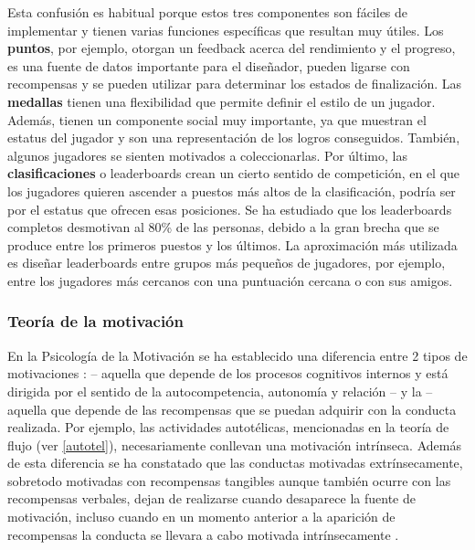 Esta confusión es habitual porque estos tres componentes son fáciles de implementar y tienen varias funciones específicas que resultan muy útiles.
%
Los \textbf{puntos}, por ejemplo, otorgan un feedback acerca del rendimiento y el progreso, es una fuente de datos importante para el diseñador, pueden ligarse con recompensas y se pueden utilizar para determinar los estados de finalización.
%
Las \textbf{medallas} tienen una flexibilidad que permite definir el estilo de un jugador. 
%
Además, tienen un componente social muy importante, ya que muestran el estatus del jugador y son una representación de los logros conseguidos. 
%
También, algunos jugadores se sienten motivados a coleccionarlas.
%
Por último, las \textbf{clasificaciones} o leaderboards crean un cierto sentido de competición, en el que los jugadores quieren ascender a puestos más altos de la clasificación, podría ser por el estatus que ofrecen esas posiciones.
%
Se ha estudiado que los leaderboards completos desmotivan al 80\% de las personas, debido a la gran brecha que se produce entre los primeros puestos y los últimos.
%
La aproximación más utilizada es diseñar leaderboards entre grupos más pequeños de jugadores, por ejemplo, entre los jugadores más cercanos con una puntuación cercana o con sus amigos.


\subsubsection{Teoría de la motivación}
\label{SDT}
\label{PosiblesPeligros}
En la Psicología de la Motivación se ha establecido una diferencia entre 2 tipos de motivaciones  \cite{SDT}:   -- aquella que depende de los procesos cognitivos internos y está dirigida por el sentido de la autocompetencia, autonomía y relación -- y la  -- aquella que depende de las recompensas que se puedan adquirir con la conducta realizada.
%
Por ejemplo, las actividades autotélicas, mencionadas en la teoría de flujo (ver \ref{autotel}), necesariamente conllevan una motivación intrínseca.
%
Además de esta diferencia se ha constatado que las conductas motivadas extrínsecamente, sobretodo motivadas con recompensas tangibles aunque también ocurre con las recompensas verbales, dejan de realizarse cuando desaparece la fuente de motivación, incluso cuando en un momento anterior a la aparición de recompensas la conducta se llevara a cabo motivada intrínsecamente
%
 \cite{ExtrinsicEatsIntrinsic}.

